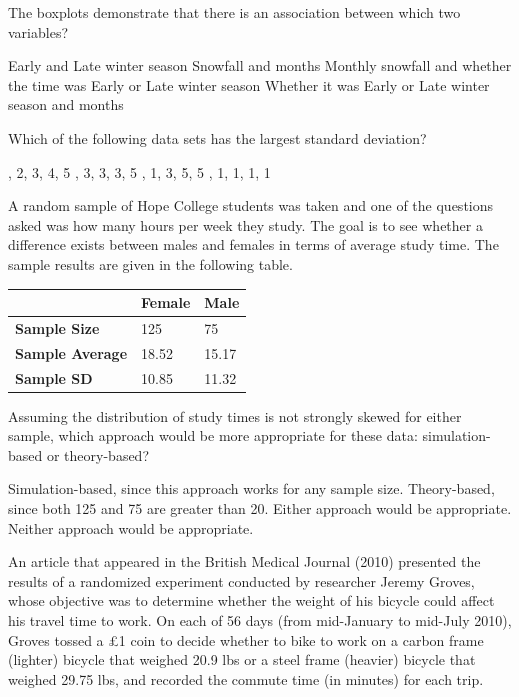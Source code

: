 \documentclass{article}
\begin{document}
\begin{mcquestions}
		\question[follow] The boxplots demonstrate that there is an association between which two variables?
		\begin{mcanswerslist}
			\answer Early and Late winter season
			\answer Snowfall and months
			\answer[correct] Monthly snowfall and whether the time was Early or Late winter season
			\answer Whether it was Early or Late winter season and months
		\end{mcanswerslist}
		
		\question Which of the following data sets has the largest standard deviation?
		\begin{mcanswerslist}
			, 2, 3, 4, 5
			, 3, 3, 3, 5
			, 1, 3, 5, 5
			, 1, 1, 1, 1
		\end{mcanswerslist}
		
		\begin{mcquestioninstruction}
			A random sample of Hope College students was taken and one of the questions asked was how many hours per week they study.  The goal is to see whether a difference exists between males and females in terms of average study time.  The sample results are given in the following table.
			\begin{center}
				\begin{tabular}{| l | l | l |}
					\hline
					& \textbf{Female} & \textbf{Male} \\
					\hline
					\textbf{Sample Size} & 125 & 75 \\
					\hline
					\textbf{Sample Average} & 18.52 & 15.17 \\
					\hline
					\textbf{Sample SD} & 10.85 & 11.32 \\
					\hline
				\end{tabular}
			\end{center}
		\end{mcquestioninstruction}
		
		\question Assuming the distribution of study times is not strongly skewed for either sample, which approach would be more appropriate for these data: simulation-based or theory-based?
		\begin{mcanswerslist}
			\answer Simulation-based, since this approach works for any sample size.
			\answer Theory-based, since both 125 and 75 are greater than 20.
			\answer[correct] Either approach would be appropriate.
			\answer Neither approach would be appropriate.
		\end{mcanswerslist}
		
		\begin{mcquestioninstruction}
			An article that appeared in the British Medical Journal (2010) presented the results of a randomized experiment conducted by researcher Jeremy Groves, whose objective was to determine whether the weight of his bicycle could affect his travel time to work. On each of 56 days (from mid-January to mid-July 2010), Groves tossed a £1 coin to decide whether to bike to work on a carbon frame (lighter) bicycle that weighed 20.9 lbs or a steel frame (heavier) bicycle that weighed 29.75 lbs, and recorded the commute time (in minutes) for each trip.
			

\end{mcquestioninstruction}
\end{mcquestions}
\end{document}
